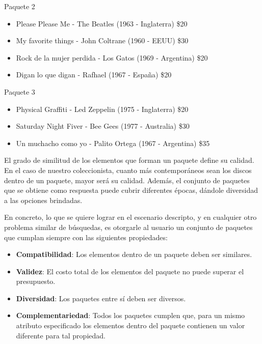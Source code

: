 \begin{mybox}{Paquete 2}
	\begin{itemize}
		\item {\scriptsize Please Please Me - The Beatles (1963 - Inglaterra) \$20}
		\item {\scriptsize My favorite things - John Coltrane (1960 - EEUU) \$30}
		\item {\scriptsize Rock de la mujer perdida - Los Gatos (1969 - Argentina) \$20}
		\item {\scriptsize Digan lo que digan - Rafhael (1967 - España) \$20}
	\end{itemize}
\end{mybox}

\begin{mybox}{Paquete 3}
	\begin{itemize}
		\item {\scriptsize Physical Graffiti - Led Zeppelin (1975 - Inglaterra) \$20}
		\item {\scriptsize Saturday Night Fiver - Bee Gees (1977 - Australia) \$30}
		\item {\scriptsize Un muchacho como yo - Palito Ortega (1967 - Argentina) \$35}
	\end{itemize}
\end{mybox}

El grado de similitud de los elementos que forman un paquete define su calidad. En el caso de nuestro coleccionista, cuanto 
más contemporáneos sean los discos dentro de un paquete, mayor será su calidad. Además, el conjunto de paquetes que se obtiene como respuesta puede cubrir diferentes épocas, dándole diversidad a las opciones brindadas. 

En concreto, lo que se quiere lograr en el escenario descripto, y en cualquier otro problema similar de búsquedas, es otorgarle al usuario un conjunto de paquetes que cumplan siempre con las siguientes propiedades: 

\begin{itemize}
\item \textbf{Compatibilidad}: Los elementos dentro de un paquete deben ser similares.
\item \textbf{Validez}: El costo total de los elementos del paquete no puede superar el presupuesto.
\item \textbf{Diversidad}: Los paquetes entre sí deben ser diversos.
\item \textbf{Complementariedad}: Todos los paquetes cumplen que, para un mismo atributo especificado los elementos dentro del paquete contienen un valor diferente para tal propiedad.
\end{itemize}

